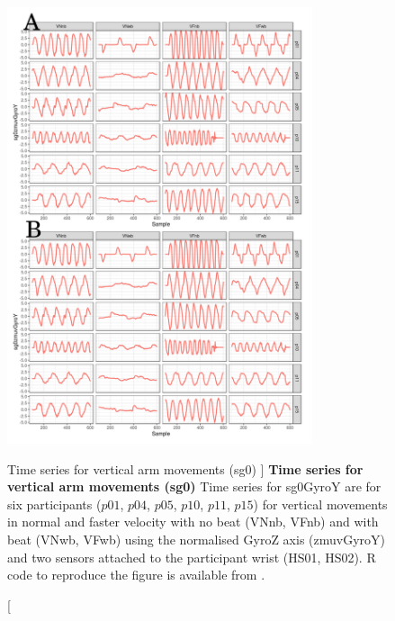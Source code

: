 \begin{figure}
\centering
\includegraphics[width=0.8\textwidth]{tssg0gyroY}
	\caption
	[Time series for vertical arm movements (sg0) ]{
	{\bf Time series for vertical arm movements (sg0)}
		Time series for sg0GyroY  are for six participants 
		($p01$, $p04$, $p05$, $p10$, $p11$, $p15$) 
		for vertical movements in normal and faster velocity with
		no beat	(VNnb, VFnb) and with beat (VNwb, VFwb) using 
		the normalised GyroZ axis (zmuvGyroY) and 
		two sensors attached to the participant wrist (HS01, HS02).
	R code to reproduce the figure is available from \cite{hwum2018}.
	}
    \label{fig:tssg0gyroY-hii}
\end{figure}


